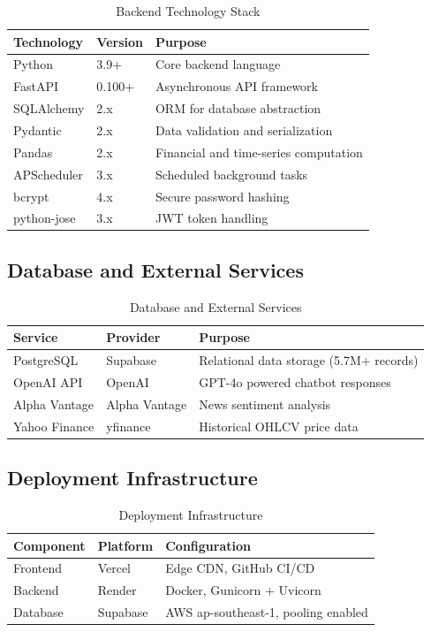 \begin{table}[H]
\centering
\begin{tabular}{lll}
\toprule
\textbf{Technology} & \textbf{Version} & \textbf{Purpose} \\
\midrule
Python & 3.9+ & Core backend language \\
FastAPI & 0.100+ & Asynchronous API framework \\
SQLAlchemy & 2.x & ORM for database abstraction \\
Pydantic & 2.x & Data validation and serialization \\
Pandas & 2.x & Financial and time-series computation \\
APScheduler & 3.x & Scheduled background tasks \\
bcrypt & 4.x & Secure password hashing \\
python-jose & 3.x & JWT token handling \\
\bottomrule
\end{tabular}
\caption{Backend Technology Stack}
\label{tab:backend_stack}
\end{table}

\subsection{Database and External Services}

\begin{table}[H]
\centering
\begin{tabular}{lll}
\toprule
\textbf{Service} & \textbf{Provider} & \textbf{Purpose} \\
\midrule
PostgreSQL & Supabase & Relational data storage (5.7M+ records) \\
OpenAI API & OpenAI & GPT-4o powered chatbot responses \\
Alpha Vantage & Alpha Vantage & News sentiment analysis \\
Yahoo Finance & yfinance & Historical OHLCV price data \\
\bottomrule
\end{tabular}
\caption{Database and External Services}
\label{tab:external_services}
\end{table}

\subsection{Deployment Infrastructure}

\begin{table}[H]
\centering
\begin{tabular}{lll}
\toprule
\textbf{Component} & \textbf{Platform} & \textbf{Configuration} \\
\midrule
Frontend & Vercel & Edge CDN, GitHub CI/CD \\
Backend & Render & Docker, Gunicorn + Uvicorn \\
Database & Supabase & AWS ap-southeast-1, pooling enabled \\
\bottomrule
\end{tabular}
\caption{Deployment Infrastructure}
\label{tab:deployment_stack}
\end{table}



